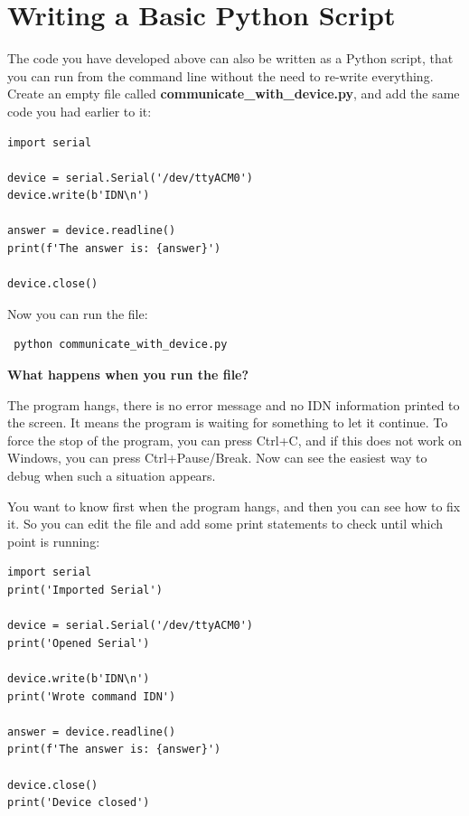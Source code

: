 \section{Writing a Basic Python Script}\label{sec:basic-python-script}
The code you have developed above can also be written as a Python script, that you can run from the command line without the need to re-write everything. Create an empty file called \textbf{communicate\_with\_device.py}, and add the same code you had earlier to it:

\begin{verbatim}
import serial

device = serial.Serial('/dev/ttyACM0')
device.write(b'IDN\n')

answer = device.readline()
print(f'The answer is: {answer}')

device.close()
\end{verbatim}

Now you can run the file:

\begin{verbatim}
 python communicate_with_device.py
\end{verbatim}


\textbf{What happens when you run the file?}

The program hangs, there is no error message and no IDN information printed to the screen. It means the program is waiting for something to let it continue. To force the stop of the program, you can press Ctrl+C, and if this does not work on Windows, you can press Ctrl+Pause/Break. Now can see the easiest way to debug when such a situation appears.

You want to know first when the program hangs, and then you can see how to fix it. So you can edit the file and add some print statements to check until which point is running:

\begin{verbatim}
import serial
print('Imported Serial')

device = serial.Serial('/dev/ttyACM0')
print('Opened Serial')

device.write(b'IDN\n')
print('Wrote command IDN')

answer = device.readline()
print(f'The answer is: {answer}')

device.close()
print('Device closed')
\end{verbatim}

